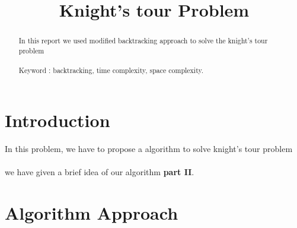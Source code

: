 \documentclass[conference]{IEEEtran}
\begin{document}
\title{
Knight's tour Problem \\
}

\author{
\and
{}
\and
{}
}

\maketitle

\noindent \begin{abstract}

In this report we used modified backtracking approach to solve the knight's tour problem \\\\
Keyword : backtracking, time complexity, space complexity.

\end{abstract}


\section{\textbf{Introduction}}
\noindent In this problem, we have to propose a algorithm to solve knight's tour problem \\\\

\noindent we have given a brief idea of our algorithm \textbf{part II}.\\


\section{\textbf {Algorithm Approach}}
\end{document}
